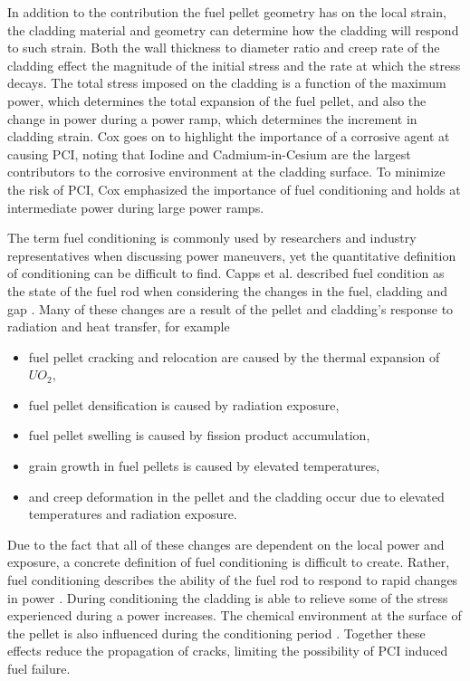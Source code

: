 \documentclass[edeposit,fullpage,11pt]{uiucthesis2009}
\begin{document}
In addition to the contribution the fuel pellet geometry has on the local strain, the cladding material and geometry can determine how the cladding will respond to such strain.
Both the wall thickness to diameter ratio and creep rate of the cladding effect the magnitude of the initial stress and the rate at which the stress decays.
The total stress imposed on the cladding is a function of the maximum power, which determines the total expansion of the fuel pellet, and also the change in power during a power ramp, which determines the increment in cladding strain.
Cox goes on to highlight the importance of a corrosive agent at causing \gls{PCI}, noting that Iodine and Cadmium-in-Cesium are the largest contributors to the corrosive environment at the cladding surface.
To minimize the risk of \gls{PCI}, Cox emphasized the importance of fuel conditioning and holds at intermediate power during large power ramps.

The term fuel conditioning is commonly used by researchers and industry representatives when discussing power maneuvers, yet the quantitative definition of conditioning can be difficult to find.
Capps et al. described fuel condition as the state of the fuel rod when considering the changes in the fuel, cladding and gap \cite{capps_evaluation_2016}.
Many of these changes are a result of the pellet and cladding's response to radiation and heat transfer, for example
\begin{itemize}
\item fuel pellet cracking and relocation are caused by the thermal expansion of $UO_2$,
\item fuel pellet densification is caused by radiation exposure,
\item fuel pellet swelling is caused by fission product accumulation,
\item grain growth in fuel pellets is caused by elevated temperatures,
\item and creep deformation in the pellet and the cladding occur due to elevated temperatures and radiation exposure.
\end{itemize}
Due to the fact that all of these changes are dependent on the local power and exposure, a concrete definition of fuel conditioning is difficult to create.
Rather, fuel conditioning describes the ability of the fuel rod to respond to rapid changes in power \cite{capps_evaluation_2016}.
During conditioning the cladding is able to relieve some of the stress experienced during a power increases.
The chemical environment at the surface of the pellet is also influenced during the conditioning period \cite{cox_pellet-clad_1990}.
Together these effects reduce the propagation of cracks, limiting the possibility of \gls{PCI} induced fuel failure.
\end{document}
